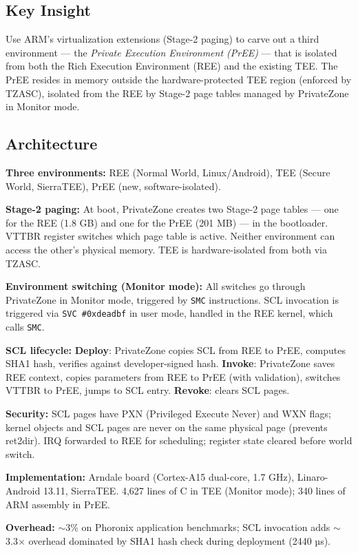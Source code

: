\documentclass[11pt,letterpaper]{article}
\begin{document}
\subsection*{Key Insight}
Use ARM's virtualization extensions (Stage-2 paging) to carve out a third environment — the \emph{Private Execution Environment (PrEE)} — that is isolated from both the Rich Execution Environment (REE) and the existing TEE.
The PrEE resides in memory outside the hardware-protected TEE region (enforced by TZASC), isolated from the REE by Stage-2 page tables managed by PrivateZone in Monitor mode.

\subsection*{Architecture}
\textbf{Three environments:} REE (Normal World, Linux/Android), TEE (Secure World, SierraTEE), PrEE (new, software-isolated).

\textbf{Stage-2 paging:}
At boot, PrivateZone creates two Stage-2 page tables — one for the REE (1.8 GB) and one for the PrEE (201 MB) — in the bootloader.
VTTBR register switches which page table is active.
Neither environment can access the other's physical memory.
TEE is hardware-isolated from both via TZASC.

\textbf{Environment switching (Monitor mode):}
All switches go through PrivateZone in Monitor mode, triggered by \texttt{SMC} instructions.
SCL invocation is triggered via \texttt{SVC \#0xdeadbf} in user mode, handled in the REE kernel, which calls \texttt{SMC}.

\textbf{SCL lifecycle:}
\textbf{Deploy}: PrivateZone copies SCL from REE to PrEE, computes SHA1 hash, verifies against developer-signed hash.
\textbf{Invoke}: PrivateZone saves REE context, copies parameters from REE to PrEE (with validation), switches VTTBR to PrEE, jumps to SCL entry.
\textbf{Revoke}: clears SCL pages.

\textbf{Security:}
SCL pages have PXN (Privileged Execute Never) and WXN flags; kernel objects and SCL pages are never on the same physical page (prevents ret2dir).
IRQ forwarded to REE for scheduling; register state cleared before world switch.

\textbf{Implementation:} Arndale board (Cortex-A15 dual-core, 1.7 GHz), Linaro-Android 13.11, SierraTEE.
4,627 lines of C in TEE (Monitor mode); 340 lines of ARM assembly in PrEE.

\textbf{Overhead:} $\sim$3\% on Phoronix application benchmarks; SCL invocation adds $\sim$3.3$\times$ overhead dominated by SHA1 hash check during deployment (2440 µs).
\end{document}

